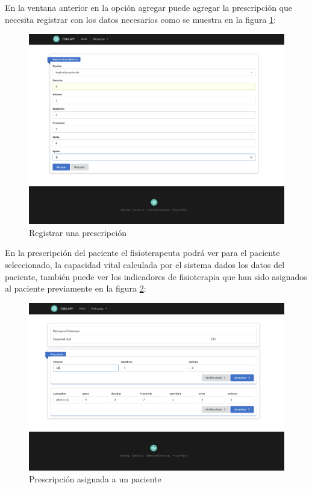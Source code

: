\documentclass[12pt]{article}
\begin{document}
En la ventana anterior en la opción agregar puede agregar la prescripción que necesita registrar con los datos necesarios como se muestra en la figura \ref{37}:


\begin{figure}[ht]
\centering
\includegraphics[scale=0.3]{imag/appregistrarpreescripcion.png}
\caption{Registrar una prescripción}
\label{37}
\end{figure}
\FloatBarrier


En la prescripción del paciente el fisioterapeuta podrá ver para el paciente seleccionado, la capacidad vital calculada por el sistema dados los datos del paciente, también puede ver los indicadores de fisioterapia que han sido asignados al paciente previamente en la figura \ref{38}:

\begin{figure}[ht]
\centering
\includegraphics[scale=0.3]{imag/appprescripcionuser.png}
\caption{Prescripción asignada a un paciente}
\label{38}
\end{figure}
\FloatBarrier
\end{document}
